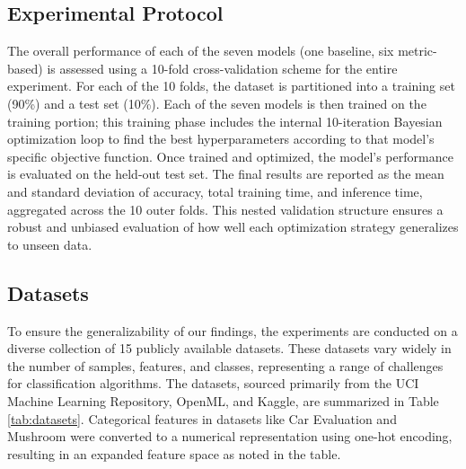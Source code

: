 \documentclass[conference]{IEEEtran}
\begin{document}
\subsection{Experimental Protocol}
The overall performance of each of the seven models (one baseline, six metric-based) is assessed using a 10-fold cross-validation scheme for the entire experiment. For each of the 10 folds, the dataset is partitioned into a training set (90\%) and a test set (10\%). Each of the seven models is then trained on the training portion; this training phase includes the internal 10-iteration Bayesian optimization loop to find the best hyperparameters according to that model's specific objective function. Once trained and optimized, the model's performance is evaluated on the held-out test set. The final results are reported as the mean and standard deviation of accuracy, total training time, and inference time, aggregated across the 10 outer folds. This nested validation structure ensures a robust and unbiased evaluation of how well each optimization strategy generalizes to unseen data.

\subsection{Datasets}
To ensure the generalizability of our findings, the experiments are conducted on a diverse collection of 15 publicly available datasets. These datasets vary widely in the number of samples, features, and classes, representing a range of challenges for classification algorithms. The datasets, sourced primarily from the UCI Machine Learning Repository, OpenML, and Kaggle, are summarized in Table \ref{tab:datasets}. Categorical features in datasets like Car Evaluation and Mushroom were converted to a numerical representation using one-hot encoding, resulting in an expanded feature space as noted in the table.
\end{document}
